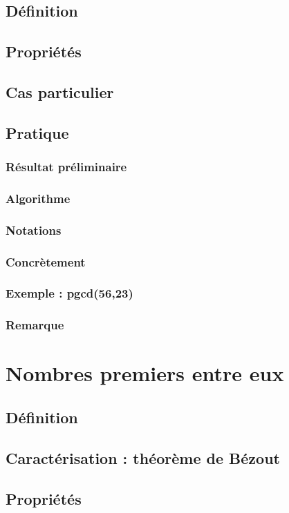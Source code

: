 \documentclass[12pt,a4paper,french]{book}
\begin{document}
		\subsection{Définition}
		\subsection{Propriétés}
		\subsection{Cas particulier}
		\subsection{Pratique}
			\subsubsection{Résultat préliminaire}
			\subsubsection{Algorithme}
			\subsubsection{Notations}
			\subsubsection{Concrètement}
			\subsubsection{Exemple : pgcd(56,23)}
			\subsubsection{Remarque}
	\section{Nombres premiers entre eux}
		\subsection{Définition}
		\subsection{Caractérisation : théorème de Bézout}
		\subsection{Propriétés}
\end{document}
